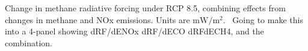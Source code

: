 Change in methane radiative forcing under RCP 8.5, combining effects from changes in methane and NOx emissions. Units are $\mathrm{mW/m^2}$.~\label{fig:drfcomb85} Going to make this into a 4-panel showing dRF/dENOx dRF/dECO dRFdECH4, and the combination.